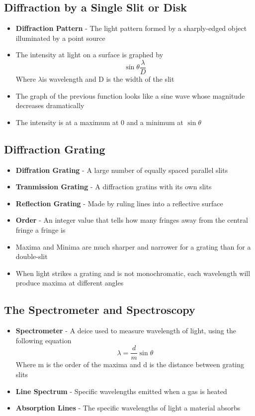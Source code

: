 \subsection{Diffraction by a Single Slit or Disk}
\begin{itemize}
    \item \textbf{Diffraction Pattern} - The light pattern formed by a sharply-edged object illuminated by a point source
    \item The intensity at light on a surface is graphed by \[\sin\theta\frac{\lambda}{D}\] Where \(\lambda\)is wavelength and D is the width of the slit
    \item The graph of the previous function looks like a sine wave whose magnitude decreases dramatically
    \item The intensity is at a maximum at 0 and a minimum at \(\sin\theta\)
\end{itemize}

\subsection{Diffraction Grating}
\begin{itemize}
    \item \textbf{Diffration Grating} - A large number of equally spaced parallel slits
    \item \textbf{Tranmission Grating} - A diffraction gratins with its own slits
    \item \textbf{Reflection Grating} - Made by ruling lines into a reflective surface 
    \item \textbf{Order} - An integer value that tells how many fringes away from the central fringe a fringe is
    \item Maxima and Minima are much sharper and narrower for a grating than for a double-slit
    \item When light strikes a grating and is not monochromatic, each wavelength will produce maxima at different angles
\end{itemize}

\subsection{The Spectrometer and Spectroscopy}
\begin{itemize}
    \item \textbf{Spectrometer} - A deice used to measure wavelength of light, using the following equation \[\lambda=\frac{d}{m}\sin\theta\] Where m is the order of the maxima and d is the distance between grating slits
    \item \textbf{Line Spectrum} - Specific wavelengths emitted when a gas is heated
    \item \textbf{Absorption Lines} - The specific wavelengths of light a material absorbs
\end{itemize}

